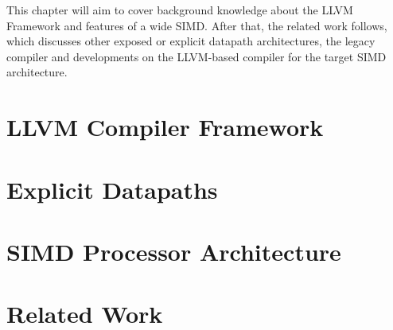 This chapter will aim to cover background knowledge about the LLVM Framework and features of a wide SIMD. After that, the related work follows, which discusses other exposed or explicit datapath architectures, the legacy compiler and developments on the LLVM-based compiler for the target SIMD architecture.

\section{LLVM Compiler Framework}\label{sec:llvm}


\newpage
\section{Explicit Datapaths}\label{sec:datapaths}


\newpage
\section{SIMD Processor Architecture}\label{sec:simd}


\section{Related Work}\label{sec:related_work}
